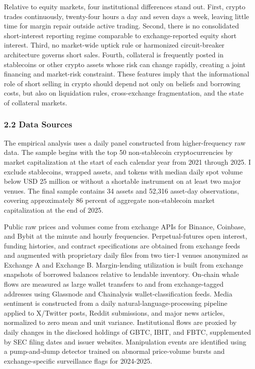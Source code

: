 \documentclass[
]{article}
\begin{document}
Relative to equity markets, four institutional differences stand out.
First, crypto trades continuously, twenty-four hours a day and seven
days a week, leaving little time for margin repair outside active
trading. Second, there is no consolidated short-interest reporting
regime comparable to exchange-reported equity short interest. Third, no
market-wide uptick rule or harmonized circuit-breaker architecture
governs short sales. Fourth, collateral is frequently posted in
stablecoins or other crypto assets whose risk can change rapidly,
creating a joint financing and market-risk constraint. These features
imply that the informational role of short selling in crypto should
depend not only on beliefs and borrowing costs, but also on liquidation
rules, cross-exchange fragmentation, and the state of collateral
markets.

\subsubsection{2.2 Data Sources}\label{22-data-sources}

The empirical analysis uses a daily panel constructed from
higher-frequency raw data. The sample begins with the top 50
non-stablecoin cryptocurrencies by market capitalization at the start of
each calendar year from 2021 through 2025. I exclude stablecoins,
wrapped assets, and tokens with median daily spot volume below USD 25
million or without a shortable instrument on at least two major venues.
The final sample contains 34 assets and 52,316 asset-day observations,
covering approximately 86 percent of aggregate non-stablecoin market
capitalization at the end of 2025.

Public raw prices and volumes come from exchange APIs for Binance,
Coinbase, and Bybit at the minute and hourly frequencies.
Perpetual-futures open interest, funding histories, and contract
specifications are obtained from exchange feeds and augmented with
proprietary daily files from two tier-1 venues anonymized as Exchange A
and Exchange B. Margin-lending utilization is built from exchange
snapshots of borrowed balances relative to lendable inventory. On-chain
whale flows are measured as large wallet transfers to and from
exchange-tagged addresses using Glassnode and Chainalysis
wallet-classification feeds. Media sentiment is constructed from a daily
natural-language-processing pipeline applied to X/Twitter posts, Reddit
submissions, and major news articles, normalized to zero mean and unit
variance. Institutional flows are proxied by daily changes in the
disclosed holdings of GBTC, IBIT, and FBTC, supplemented by SEC filing
dates and issuer websites. Manipulation events are identified using a
pump-and-dump detector trained on abnormal price-volume bursts and
exchange-specific surveillance flags for 2024-2025.
\end{document}

